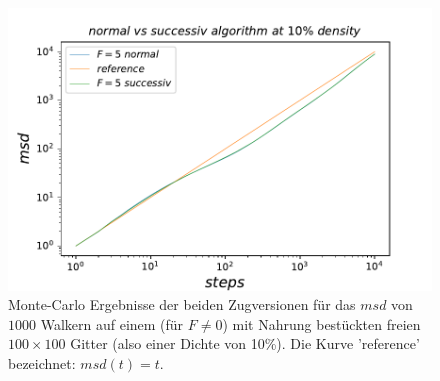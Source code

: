 \documentclass[a4paper, 12pt]{scrartcl}
\begin{document}
\begin{figure}[h!]
	\centering
	\includegraphics[scale=0.9]{suc.pdf}
	\caption{Monte-Carlo Ergebnisse der beiden Zugversionen für das $msd$ von $1000$ Walkern auf einem (für $F\neq0$) mit Nahrung bestückten freien $100\times 100$ Gitter (also einer Dichte von 10\%). Die Kurve 'reference' bezeichnet: $msd(t)=t$.}
\end{figure}

\newpage 
\end{document}
